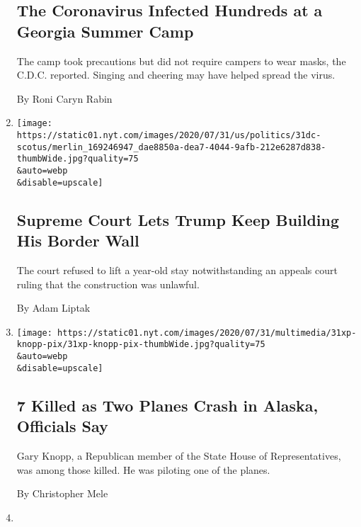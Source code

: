 \begin{enumerate}
  \hypertarget{the-coronavirus-infected-hundreds-at-a-georgia-summer-camp}{%
  \subsection{The Coronavirus Infected Hundreds at a Georgia Summer
  Camp}\label{the-coronavirus-infected-hundreds-at-a-georgia-summer-camp}}

  The camp took precautions but did not require campers to wear masks,
  the C.D.C. reported. Singing and cheering may have helped spread the
  virus.

  By Roni Caryn Rabin
\item
  \href{/2020/07/31/us/supreme-court-trump-border-wall.html}{}

  \texttt{[image: https://static01.nyt.com/images/2020/07/31/us/politics/31dc-scotus/merlin\_169246947\_dae8850a-dea7-4044-9afb-212e6287d838-thumbWide.jpg?quality=75\\\&auto=webp\\\&disable=upscale]}

  \hypertarget{supreme-court-lets-trump-keep-building-his-border-wall}{%
  \subsection{Supreme Court Lets Trump Keep Building His Border
  Wall}\label{supreme-court-lets-trump-keep-building-his-border-wall}}

  The court refused to lift a year-old stay notwithstanding an appeals
  court ruling that the construction was unlawful.

  By Adam Liptak
\item
  \href{/2020/07/31/us/alaska-plane-crash-gary-knopp.html}{}

  \texttt{[image: https://static01.nyt.com/images/2020/07/31/multimedia/31xp-knopp-pix/31xp-knopp-pix-thumbWide.jpg?quality=75\\\&auto=webp\\\&disable=upscale]}

  \hypertarget{7-killed-as-two-planes-crash-in-alaska-officials-say}{%
  \subsection{7 Killed as Two Planes Crash in Alaska, Officials
  Say}\label{7-killed-as-two-planes-crash-in-alaska-officials-say}}

  Gary Knopp, a Republican member of the State House of Representatives,
  was among those killed. He was piloting one of the planes.

  By Christopher Mele
\item
  \href{/2020/07/31/us/politics/trump-campaign-tv-advertising.html}{}


\end{enumerate}
